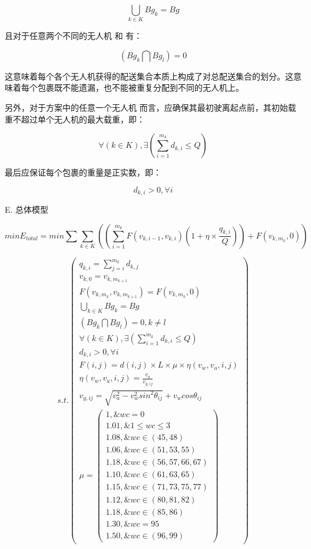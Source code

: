 \documentclass[UTF8,fontset=windows,12pt,a4paper]{ctexart}
\begin{document}
\[⋃_{k\in K}^{} B{g}_{k}=Bg\]

且对于任意两个不同的无人机  和  有：

\[\left(B{g}_{k}⋂B{g}_{l}\right)=0\]

这意味着每个各个无人机获得的配送集合本质上构成了对总配送集合的划分。这意味着每个包裹既不能遗漏，也不能被重复分配到不同的无人机上。

另外，对于方案中的任意一个无人机  而言，应确保其最初驶离起点前，其初始载重不超过单个无人机的最大载重，即：

\[∀\left(k\in K\right),∃\left(\sum _{i=1}^{{m}_{k}} {d}_{k,i}\le Q\right)\]

最后应保证每个包裹的重量是正实数，即：

\[{d}_{k,i}>0,   ∀i\]

E. 总体模型

\[min{E}_{total}=min\sum \sum _{k\in K}^{} \left(\left(\sum _{i=1}^{{m}_{k}} F\left({v}_{k,i-1},{v}_{k,i}\right)\left(1+η\times \frac{{q}_{k,i}}{Q}\right)\right)+F\left({v}_{k,{m}_{k}},0\right)\right)\]

\[s.t.\left(\begin{aligned}{q}_{k,i}=\sum _{j=i}^{{m}_{k}} {d}_{k,j} \\ {v}_{k,0}={v}_{k,{m}_{k+1}} \\ F\left({v}_{k,{m}_{k}},{v}_{k,{m}_{k+1}}\right)=F\left({v}_{k,{m}_{k}},0\right) \\ ⋃_{k\in K}^{} B{g}_{k}=Bg \\ \left(B{g}_{k}⋂B{g}_{l}\right)=0,k\ne l \\ ∀\left(k\in K\right),∃\left(\sum _{i=1}^{{m}_{k}} {d}_{k,i}\le Q\right) \\ {d}_{k,i}>0, ∀i \\ F\left(i,j\right)=d\left(i,j\right)\times L\times \mu \times η\left({v}_{w},{v}_{a},i,j\right) \\ η\left({v}_{w},{v}_{a},i,j\right)=\frac{{v}_{a}}{{v}_{g,ij}} \\ {v}_{g,ij}=\sqrt{{v}_{a}^{2}-{v}_{w}^{2}{sin}^{2}{\theta }_{ij}}+{v}_{w}cos{\theta }_{ij} \\ \mu =\left(\begin{aligned}1,\&wc=0 \\ 1.01,\&1\le wc\le 3 \\ 1.08,\&wc\in \left(45,48\right) \\ 1.06,\&wc\in \left(51,53,55\right) \\ 1.18,\&wc\in \left(56,57,66,67\right) \\ 1.10,\&wc\in \left(61,63,65\right) \\ 1.15,\&wc\in \left(71,73,75,77\right) \\ 1.12,\&wc\in \left(80,81,82\right) \\ 1.18,\&wc\in \left(85,86\right) \\ 1.30,\&wc=95 \\ 1.50,\&wc\in \left(96,99\right)\end{aligned}\right)\end{aligned}\right)\]
\end{document}
